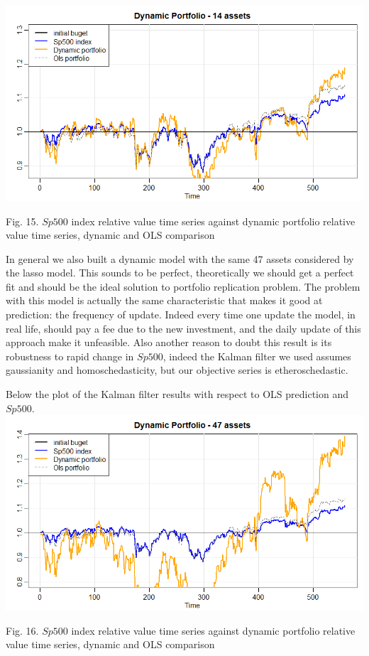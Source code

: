 \documentclass{article}%
\begin{document}
\includegraphics[scale=0.55]{dynamic14}
\begin{center}
\begin{small}
Fig. 15. $Sp500$ index relative value time series against dynamic portfolio relative value time series, dynamic and OLS comparison
\\

\end{small}
\end{center}


In general we also built a dynamic model with the same 47 assets considered by the lasso model. This sounds to be perfect, theoretically we should get a perfect fit and should be the ideal solution to portfolio replication problem. The problem with this model is actually the same characteristic that makes it  good at prediction: the frequency of update. Indeed every time one update the model, in real life, should pay a fee due to the new investment, and the daily update of this approach make it unfeasible. Also another reason to doubt this result is its robustness to rapid change in $Sp500$, indeed the Kalman filter we used assumes gaussianity and homoschedasticity, but our objective series is etheroschedastic.  

Below the plot of the Kalman filter results with respect to OLS prediction and $Sp500$.
\\

\includegraphics[scale=0.55]{dynamic47}
\begin{center}
\begin{small}
Fig. 16. $Sp500$ index relative value time series against dynamic portfolio relative value time series, dynamic and OLS comparison
\\

\end{small}
\end{center}
\end{document}
